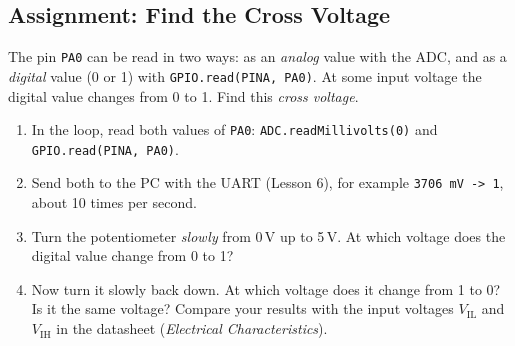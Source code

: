 \documentclass[11pt,a4paper]{article}
\newcommand{\code}[1]{\texttt{#1}}
\begin{document}
\subsection*{Assignment: Find the Cross Voltage}
The pin \code{PA0} can be read in two ways: as an \emph{analog} value with the
ADC, and as a \emph{digital} value (0 or 1) with \code{GPIO.read(PINA, PA0)}.
At some input voltage the digital value changes from 0 to 1. Find this
\emph{cross voltage}.
\begin{enumerate}
  \item In the loop, read both values of \code{PA0}:
        \code{ADC.readMillivolts(0)} and \code{GPIO.read(PINA, PA0)}.
  \item Send both to the PC with the UART (Lesson 6), for example
        \code{3706 mV -> 1}, about 10 times per second.
  \item Turn the potentiometer \emph{slowly} from 0\,V up to 5\,V. At which
        voltage does the digital value change from 0 to 1?
  \item Now turn it slowly back down. At which voltage does it change from 1
        to 0? Is it the same voltage? Compare your results with the input
        voltages $V_{\text{IL}}$ and $V_{\text{IH}}$ in the datasheet
        (\emph{Electrical Characteristics}).
\end{enumerate}
\end{document}
